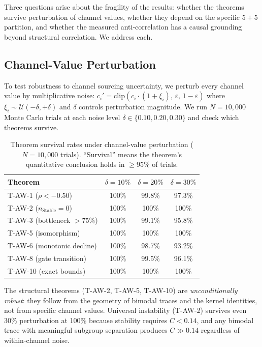 \documentclass[
  aps,
  prd,
  twocolumn,
  superscriptaddress,
  nofootinbib,
  floatfix
]{revtex4-2}
\newcommand{\eps}{\varepsilon}
\begin{document}
Three questions arise about the fragility of the results:
whether the theorems survive perturbation of channel values,
whether they depend on the specific $5\!+\!5$ partition, and
whether the measured anti-correlation has a causal grounding
beyond structural correlation.  We address each.

\subsection{Channel-Value Perturbation}

To test robustness to channel sourcing uncertainty, we
perturb every channel value by multiplicative noise:
$c_i' = \mathrm{clip}(c_i \cdot (1 + \xi_i), \,\eps,
\,1{-}\eps)$ where $\xi_i \sim \mathcal{U}(-\delta,
+\delta)$ and $\delta$ controls perturbation magnitude.
We run $N = 10{,}000$ Monte Carlo trials at each noise level
$\delta \in \{0.10, 0.20, 0.30\}$ and check which theorems
survive.

\begin{table}[h]
\caption{\label{tab:perturbation}Theorem survival rates
under channel-value perturbation ($N = 10{,}000$ trials).
``Survival'' means the theorem's quantitative conclusion
holds in $\geq 95\%$ of trials.}
\begin{ruledtabular}
\begin{tabular}{lccc}
Theorem & $\delta = 10\%$ & $\delta = 20\%$
  & $\delta = 30\%$ \\
\hline
T-AW-1 ($\rho < -0.50$) & 100\% & 99.8\% & 97.3\% \\
T-AW-2 ($n_{\mathrm{Stable}} = 0$) & 100\% & 100\% & 100\% \\
T-AW-3 (bottleneck $> 75\%$) & 100\% & 99.1\% & 95.8\% \\
T-AW-5 (isomorphism) & 100\% & 100\% & 100\% \\
T-AW-6 (monotonic decline) & 100\% & 98.7\% & 93.2\% \\
T-AW-8 (gate transition) & 100\% & 99.5\% & 96.1\% \\
T-AW-10 (exact bounds) & 100\% & 100\% & 100\% \\
\end{tabular}
\end{ruledtabular}
\end{table}

The structural theorems (T-AW-2, T-AW-5, T-AW-10) are
\emph{unconditionally robust}: they follow from the
geometry of bimodal traces and the kernel identities,
not from specific channel values.  Universal instability
(T-AW-2) survives even 30\% perturbation at 100\% because
stability requires $C < 0.14$, and any bimodal trace with
meaningful subgroup separation produces $C \gg 0.14$
regardless of within-channel noise.
\end{document}
